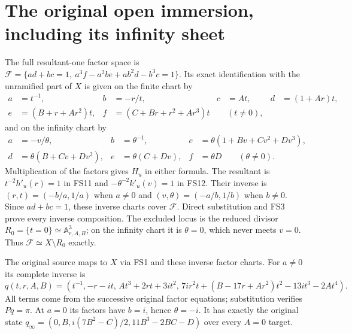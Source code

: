 \documentclass[11pt]{article}
\begin{document}
\section{The original open immersion, including its infinity sheet}
The full resultant-one factor space is
$\mathcal F=\{ad+bc=1,\ a^3f-a^2be+ab^2d-b^3c=1\}$.
Its exact identification with the unramified part of $X$
is given on the finite chart by
\begin{align}
a&=t^{-1},&b&=-r/t,&c&=At,&d&=(1+Ar)t,\nonumber\\
e&=(B+r+Ar^2)t,&f&=(C+Br+r^2+Ar^3)t&& (t\ne0),
\tag{FS11}
\end{align}
and on the infinity chart by
\begin{align}
a&=-v/\theta,&b&=\theta^{-1},&
c&=\theta(1+Bv+Cv^2+Dv^3),\nonumber\\
d&=\theta(B+Cv+Dv^2),&
e&=\theta(C+Dv),&f&=\theta D
\qquad(\theta\ne0).
\tag{FS12}
\end{align}
Multiplication of the factors gives $H_u$ in either formula.
The resultant is $t^{-2}h'_u(r)=1$ in FS11 and
$-\theta^{-2}k'_u(v)=1$ in FS12.
Their inverse is $(r,t)=(-b/a,1/a)$ when $a\ne0$ and
$(v,\theta)=(-a/b,1/b)$ when $b\ne0$.
Since $ad+bc=1$, these inverse charts cover $\mathcal F$.
Direct substitution and FS3 prove every inverse composition.
The excluded locus is the reduced divisor
$R_0=\{t=0\}\simeq\mathbb A^3_{r,A,B}$; on the infinity
chart it is $\theta=0$, which never meets $v=0$.
Thus $\mathcal F\simeq X\setminus R_0$ exactly.

The original source maps to $X$ via FS1 and these inverse
factor charts. For $a\ne0$ its complete inverse is
\begin{equation}
q(t,r,A,B)=\left(t^{-1},-r-it,\,
At^3+2rt+3it^2,\,
7ir^2t+(B-17r+Ar^2)t^2-13it^3-2At^4\right).
\tag{FS13}
\end{equation}
All terms come from the successive original factor equations;
substitution verifies $Pq=\pi$.
At $a=0$ its factors have $b=i$, hence $\theta=-i$.
It has exactly the original state
$q_\infty=(0,B,i(7B^2-C)/2,11B^3-2BC-D)$ over
every $A=0$ target.
\end{document}
